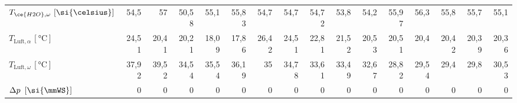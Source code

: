 \begin{table}[h!]
{\begin{tabular}{l|rrrrr|rrrrr|rrrrr}
		$T_{\ce{H2O},\omega} \, \left[\si{\celsius}\right]$   & 54,5  & 57    & 50,58 & 55,1  & 55,83 & 54,7  & 54,7  & 54,72 & 53,8  & 54,2  & 55,97 & 56,3  & 55,8  & 55,7  & 55,1 \\
		 $T_{\text{Luft},\alpha}\, \left[\si{\celsius}\right]$  & 24,51 & 20,41 & 20,21 & 18,09 & 17,86 & 26,42 & 24,51 & 22,81 & 21,52 & 20,53 & 20,51 & 20,4  & 20,42 & 20,39 & 20,36 \\
		$T_{\text{Luft},\omega}\, \left[\si{\celsius}\right]$   & 37,92 & 39,52 & 34,54 & 35,54 & 36,19 & 35    & 34,78 & 33,61 & 33,49 & 32,67 & 28,82 & 29,54 & 29,4  & 29,8  & 30,53 \\
		$\Delta p \ \left[\si{\mmWS}\right]$    & 0     & 0     & 0     & 0     & 0     & 0     & 0     & 0     & 0     & 0     & 0     & 0     & 0     & 0     & 0 \\
		\bottomrule
	\end{tabular}}
	\label{tab:ergebnisse}%
\end{table}%
\FloatBarrier

%


